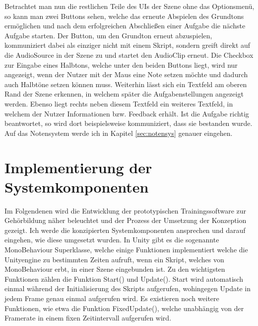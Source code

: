 Betrachtet man nun die restlichen Teile des UIs der Szene ohne das Optionsmenü, so kann man zwei Buttons sehen, welche das erneute Abspielen des Grundtons ermöglichen und nach dem erfolgreichen Abschließen einer Aufgabe die nächste Aufgabe starten. Der Button, um den Grundton erneut abzuspielen, kommuniziert dabei als einziger nicht mit einem Skript, sondern greift direkt auf die AudioSource in der Szene zu und startet den AudioClip erneut. Die Checkbox zur Eingabe eines Halbtons, welche unter den beiden Buttons liegt, wird nur angezeigt, wenn der Nutzer mit der Maus eine Note setzen möchte und dadurch auch Halbtöne setzen können muss. Weiterhin lässt sich ein Textfeld am oberen Rand der Szene erkennen, in welchem später die Aufgabenstellungen angezeigt werden. Ebenso liegt rechts neben diesem Textfeld ein weiteres Textfeld, in welchem der Nutzer Informationen bzw. Feedback erhält. Ist die Aufgabe richtig beantwortet, so wird dort beispielsweise kommuniziert, dass sie bestanden wurde. Auf das Notensystem werde ich in Kapitel \ref{sec:notensys} genauer eingehen. 

\section{Implementierung der Systemkomponenten}
Im Folgendenen wird die Entwicklung der prototypischen Trainingssoftware zur Gehörbildung näher beleuchtet und der Prozess der Umsetzung der Konzeption gezeigt. Ich werde die konzipierten Systemkomponenten ansprechen und darauf eingehen, wie diese umgesetzt wurden. 
In Unity gibt es die sogenannte MonoBehaviour Superklasse, welche einige Funktionen implementiert welche die Unityengine zu bestimmten Zeiten aufruft, wenn ein Skript, welches von MonoBehaviour erbt, in einer Szene eingebunden ist. Zu den wichtigsten Funktionen zählen die Funktion Start() und Update(). Start wird automatisch einmal während der Initialisierung des Skripts aufgerufen, wohingegen Update in jedem Frame genau einmal aufgerufen wird. Es existieren noch weitere Funktionen, wie etwa die Funktion FixedUpdate(), welche unabhängig von der Framerate in einem fixen Zeitintervall aufgerufen wird.

